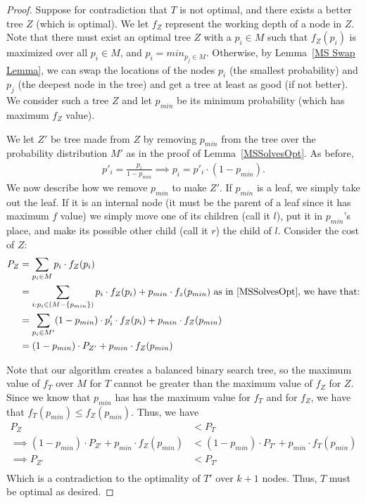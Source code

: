\documentclass[]{beamer}
\theoremstyle{plain}
\begin{document}
\begin{frame}
\begin{proof}
Suppose for contradiction that $T$ is not optimal, and there exists a better tree $Z$ (which is optimal). We let $f_Z$ represent the working depth of a node in $Z$. Note that there must exist an optimal tree $Z$ with a $p_i \in M$ such that $f_Z(p_i)$ is maximized over all $p_i \in M$, and $p_i = min_{p_j \in M}$. Otherwise, by Lemma~\ref{MS Swap Lemma}, we can swap the locations of the nodes $p_i$ (the smallest probability) and $p_j$ (the deepest node in the tree) and get a tree at least as good (if not better). We consider such a tree $Z$ and let $p_{min}$ be its minimum probability (which has maximum $f_Z$ value).

We let $Z'$ be tree made from $Z$ by removing $p_{min}$ from the tree over the probability distribution $M'$ as in the proof of Lemma~\ref{MSSolvesOpt}. As before,
\begin{align*}
p'_i=\frac{p_i}{1-p_{min}} \implies p_i = p'_i\cdot (1-p_{min}).
\end{align*}
We now describe how we remove $p_{min}$ to make $Z'$. If $p_{min}$ is a leaf, we simply take out the leaf. If it is an internal node (it must be the parent of a leaf since it has maximum $f$ value) we simply move one of its children (call it $l$), put it in $p_{min}$'s place, and make its possible other child (call it $r$) the child of $l$. Consider the cost of $Z$:
\begin{align*}
P_Z &= \sum_{p_i \in M} p_i\cdot f_Z(p_i) \\
&= \sum_{i:p_i \in (M - \{p_{min}\})} p_i\cdot f_Z(p_i) + p_{min}\cdot f_z(p_{min}) \text{ as in~\ref{MSSolvesOpt}, we have that:} \\
&= \sum_{p_i \in M'} (1-p_{min})\cdot p'_i\cdot f_Z(p_i) + p_{min}\cdot f_Z(p_{min}) \\
&= (1-p_{min})\cdot P_{Z'} + p_{min}\cdot f_Z(p_{min}) \\
\end{align*}

Note that our algorithm creates a balanced binary search tree, so the maximum value of $f_T$ over $M$ for $T$ cannot be greater than the maximum value of $f_Z$ for $Z$. Since we know that $p_{min}$ has has the maximum value for $f_T$ and for $f_Z$,  we have that $f_T(p_{min}) \leq f_Z(p_{min})$. Thus, we have
\begin{align*}
P_Z &< P_T \\
\implies (1-p_{min})\cdot P_{Z'} + p_{min}\cdot f_Z(p_{min}) &< (1-p_{min})\cdot P_{T'} + p_{min}\cdot f_T(p_{min}) \\
\implies P_{Z'} &< P_{T'} \\
\end{align*}
Which is a contradiction to the optimality of $T'$ over $k+1$ nodes. Thus, $T$ must be optimal as desired.



\end{proof}
\end{frame}
\end{document}

